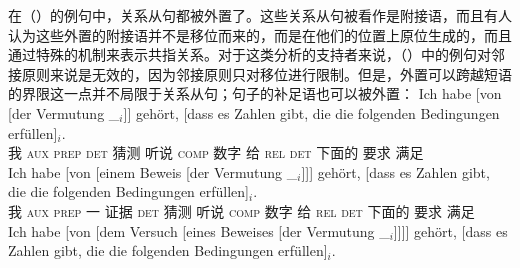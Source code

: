 在（）的例句中，关系从句都被外置了。这些关系从句被看作是附接语，而且有人认为这些外置的附接语并不是移位而来的，而是在他们的位置上原位生成的，而且通过特殊的机制来表示共指关系\citep{Kiss2005a}。对于这类分析的支持者来说，（）中的例句对邻接原则来说是无效的，因为邻接原则只对移位进行限制。但是，外置可以跨越短语的界限这一点并不局限于关系从句；句子的补足语也可以被外置：
\eal
\ex 
\gll Ich habe       [von                    [der                    Vermutung \_$_i$]] gehört, [dass es Zahlen gibt, die die folgenden Bedingungen erfüllen]$_i$.\\
     我 \textsc{aux} \spacebr{}\textsc{prep} \spacebr{}\textsc{det} 猜测 {} 听说 \spacebr{}\textsc{comp} \expl{} 数字 给 \textsc{rel} \textsc{det} 下面的 要求 满足\\
\ex 
\gll Ich habe [von [einem Beweis [der Vermutung \_$_i$]]] gehört, [dass es Zahlen gibt, die die folgenden Bedingungen erfüllen]$_i$.\\
	我 \textsc{aux} \spacebr{}\textsc{prep} \spacebr{}一 证据 \spacebr{}\textsc{det} 猜测 {} 听说 \spacebr{}\textsc{comp} \expl{} 数字 给 \textsc{rel} \textsc{det} 下面的 要求 满足\\
\ex 
\gll Ich habe [von [dem Versuch [eines Beweises [der Vermutung \_$_i$]]]] gehört, [dass es Zahlen gibt, die die folgenden Bedingungen erfüllen]$_i$.\\
